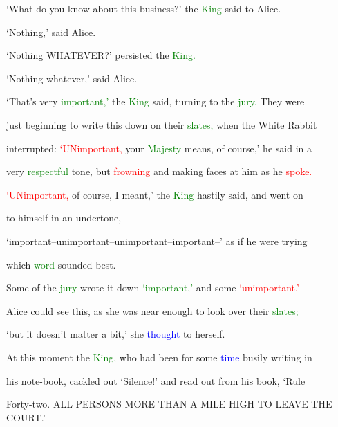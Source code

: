  ‘What do you know about this business?’ the \textcolor{green}{King} said to Alice.



 ‘Nothing,’ said Alice.



 ‘Nothing WHATEVER?’ persisted the \textcolor{green}{King.}



 ‘Nothing whatever,’ said Alice.



 ‘That’s very \textcolor{green}{important,’} the \textcolor{green}{King} said, turning to the \textcolor{green}{jury.} They were

 just beginning to write this down on their \textcolor{green}{slates,} when the \textcolor{BurntOrange}{White} Rabbit

 \textcolor{BurntOrange}{interrupted:} \textcolor{red}{‘UNimportant,} your \textcolor{green}{Majesty} means, of course,’ he said in a

 very \textcolor{green}{respectful} tone, but \textcolor{red}{frowning} and making faces at him as he \textcolor{red}{spoke.}



 \textcolor{red}{‘UNimportant,} of course, I meant,’ the \textcolor{green}{King} hastily said, and went on

 to himself in an undertone,



 ‘important--unimportant--unimportant--important--’ as if he were trying

 which \textcolor{green}{word} sounded best.



 Some of the \textcolor{green}{jury} wrote it down \textcolor{green}{‘important,’} and some \textcolor{red}{‘unimportant.’}

 Alice could see this, as she was near enough to look over their \textcolor{green}{slates;}

 ‘but it doesn’t matter a bit,’ she \textcolor{blue}{thought} to herself.



 At this moment the \textcolor{green}{King,} who had been for some \textcolor{blue}{time} busily writing in

 his note-book, cackled out ‘Silence!’ and read out from his book, \textcolor{BurntOrange}{‘Rule}

 Forty-two. ALL PERSONS MORE THAN A MILE HIGH TO \textcolor{BurntOrange}{LEAVE} THE \textcolor{BurntOrange}{COURT.’}



